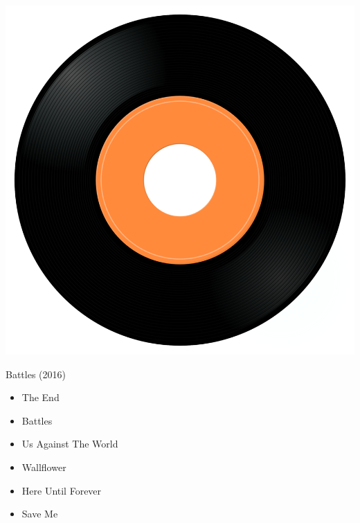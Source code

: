 \begin{minipage}[t]{0.25\textwidth}\vspace{0pt}
\captionsetup{type=figure}
\includegraphics[width=\textwidth]{Images/cover.png}
\caption*{Battles (2016)}
\end{minipage}
\begin{minipage}[t]{0.25\textwidth}\vspace{0pt}
\begin{itemize}[nosep,leftmargin=1em,labelwidth=*,align=left]
	\setlength{\itemsep}{0pt}
	\item The End
	\item Battles
	\item Us Against The World
	\item Wallflower
	\item Here Until Forever
	\item Save Me
\end{itemize}
\end{minipage}
